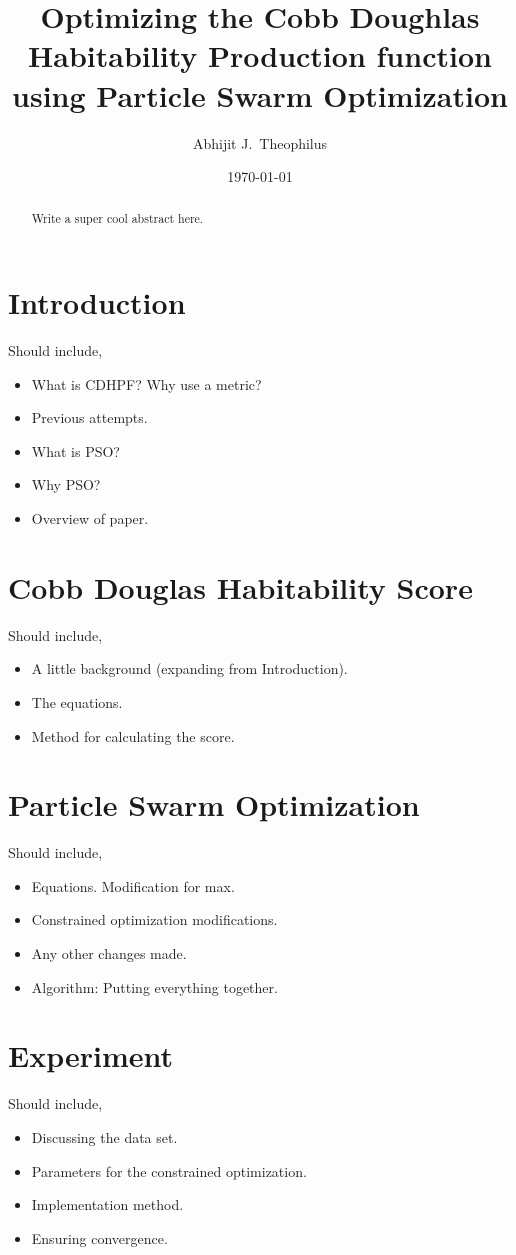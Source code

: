 \documentclass[10pt,a4paper]{article}
\title{Optimizing the Cobb Doughlas Habitability Production function using
Particle Swarm Optimization}
\author{Abhijit J.\ Theophilus}
\date{\today}
\newenvironment{pointers}{%
  \noindent Should include,
  \begin{itemize}
    \setlength{\itemsep}{-1pt}}{%
\end{itemize}}
\begin{document}
\maketitle

\begin{abstract}
  Write a super cool abstract here.
\end{abstract}


\section{Introduction}
\begin{pointers}
\item What is CDHPF\@? Why use a metric?
\item Previous attempts.
\item What is PSO\@?
\item Why PSO\@?
\item Overview of paper.
\end{pointers}


\section{Cobb Douglas Habitability Score}
\begin{pointers}
\item A little background (expanding from Introduction).
\item The equations.
\item Method for calculating the score.
\end{pointers}


\section{Particle Swarm Optimization}
\begin{pointers}
\item Equations. Modification for max.
\item Constrained optimization modifications.
\item Any other changes made.
\item Algorithm: Putting everything together.
\end{pointers}


\section{Experiment}
\begin{pointers}
\item Discussing the data set.
\item Parameters for the constrained optimization.
\item Implementation method.
\item Ensuring convergence.
\end{pointers}
\end{document}
